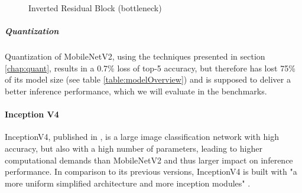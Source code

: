 \begin{figure}[!htb]
\centering
   \resizebox{.7\linewidth}{!}{}
\caption{Inverted Residual Block (bottleneck)}
\label{fig:bottleneckBlock}
\end{figure}

\subparagraph{Quantization}
Quantization of MobileNetV2, using the techniques presented in section \ref{chap:quant}, results in a  0.7\% loss of top-5 accuracy, but therefore has lost 75\% of its model size (see table \ref{table:modelOverview}) and is supposed to deliver a better inference performance, which we will evaluate in the benchmarks.



\paragraph{Inception V4}
InceptionV4, published in \cite{InceptionV4}, is a large image classification network with high accuracy, but also with a high number of parameters, leading to higher computational demands than MobileNetV2 and thus larger impact on inference performance.
In comparison to its previous versions, InceptionV4 is built with "a more uniform simplified architecture and more inception modules" \cite{InceptionV4}. 

